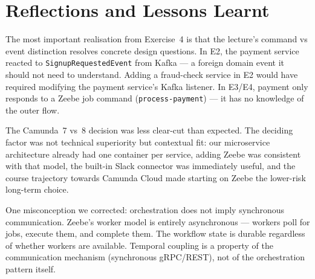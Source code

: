 \documentclass[10pt,a4paper]{article}
\begin{document}
\section{Reflections and Lessons Learnt}

The most important realisation from Exercise~4 is that the lecture's command vs event distinction resolves concrete design questions. In E2, the payment service reacted to \texttt{SignupRequestedEvent} from Kafka --- a foreign domain event it should not need to understand. Adding a fraud-check service in E2 would have required modifying the payment service's Kafka listener. In E3/E4, payment only responds to a Zeebe job command (\texttt{process-payment}) --- it has no knowledge of the outer flow.

The Camunda~7 vs~8 decision was less clear-cut than expected. The deciding factor was not technical superiority but contextual fit: our microservice architecture already had one container per service, adding Zeebe was consistent with that model, the built-in Slack connector was immediately useful, and the course trajectory towards Camunda Cloud made starting on Zeebe the lower-risk long-term choice.

One misconception we corrected: orchestration does not imply synchronous communication. Zeebe's worker model is entirely asynchronous --- workers poll for jobs, execute them, and complete them. The workflow state is durable regardless of whether workers are available. Temporal coupling is a property of the communication mechanism (synchronous gRPC/REST), not of the orchestration pattern itself.
\end{document}
